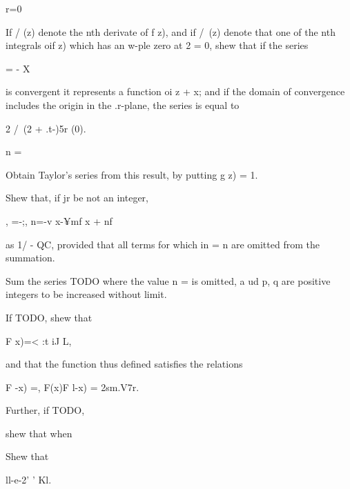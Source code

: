\begin{wandwmiscexamples}
\begin{wandwmiscexample}
    r=0

  \end{wandwmiscexample}
  \begin{wandwmiscexample}
    If / (z) denote the nth derivate of f z), and if /\ (z) denote
    that one of the nth integrals oif z) which has an w-ple zero at 2 = 0,
    shew that if the series

    = - X

    is convergent it represents a function oi z + x; and if the domain of
    convergence includes the origin in the .r-plane, the series is equal
    to


    2 /\ (2 + .t-)5r (0).

    n =

    Obtain Taylor's series from this result, by putting g z) = 1.
  \end{wandwmiscexample}
  \begin{wandwmiscexample}
    Shew that, if jr be not an integer,

    , =-;, n=-v x-¥mf x + nf

    as 1/ - QC, provided that all terms for which in = n are omitted from
    the summation.

  \end{wandwmiscexample}
  \begin{wandwmiscexample}
    Sum the series
    TODO
    where the value n = is omitted, a ud p, q are
    positive integers to be increased without
    limit.

  \end{wandwmiscexample}
  \begin{wandwmiscexample}
    If TODO, shew that

    F x)=< :t iJ L,

    and that the function thus defined satisfies the relations

    F -x) =, F(x)F l-x) = 2sm.V7r.

    Further, if TODO,

    shew that when
  \end{wandwmiscexample}
  \begin{wandwmiscexample}
    Shew that

    ll-e-2' ' Kl.



\end{wandwmiscexample}
\end{wandwmiscexamples}
